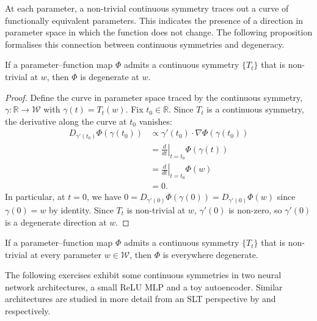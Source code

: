 \documentclass[11pt]{article}
\newcommand{\R}{\mathbb{R}}
\newcommand{\W}{\mathcal{W}}
\begin{document}
At each parameter, a non-trivial continuous symmetry traces out a curve of
functionally equivalent parameters. This indicates the presence of a direction
in parameter space in which the function does not change. The following
proposition formalises this connection between continuous symmetries and
degeneracy.

\begin{proposition}
\label{prop:symmetry-degeneracy}
    If a parameter--function map $\Phi$ admits a continuous symmetry $\{T_t\}$
    that is non-trivial at $w$, then $\Phi$ is degenerate at $w$.
\end{proposition}

\begin{proof}
    Define the curve in parameter space traced by the continuous symmetry,
    $\gamma : \R \to \W$ with $\gamma(t) = T_t(w)$.
    Fix $t_0 \in \R$. Since $T_t$ is a continuous symmetry, the derivative
    along the curve at $t_0$ vanishes:
    \begin{align*}
        D_{\gamma'(t_0)} \Phi(\gamma(t_0))
        &\propto \gamma'(t_0) \cdot \nabla \Phi(\gamma(t_0))
    \\  &= \left.\frac{d}{dt}\right|_{t=t_0} \Phi(\gamma(t))
            \tag{chain rule}
    \\  &= \left.\frac{d}{dt}\right|_{t=t_0} \Phi(w)
            \tag{symmetry, $\Phi \circ T_t = \Phi$}
    \\  &= 0.
            \tag{$\Phi(w)$ is constant in $t$}
    \end{align*}
    In particular, at $t=0$, we have
        $0 = D_{\gamma'(0)} \Phi(\gamma(0)) = D_{\gamma'(0)} \Phi(w)$
    since $\gamma(0) = w$ by identity. Since $T_t$ is non-trivial at $w$,
    $\gamma'(0)$ is non-zero, so $\gamma'(0)$ is a degenerate direction at $w$.
\end{proof}

\begin{corollary}
    If a parameter--function map $\Phi$ admits a continuous symmetry $\{T_t\}$
    that is non-trivial at every parameter $w \in \W$, then $\Phi$ is
    everywhere degenerate.
\end{corollary}

The following exercises exhibit some continuous symmetries in two neural
network architectures, a small ReLU MLP and a toy autoencoder. Similar
architectures are studied in more detail from an SLT perspective by
\citet{Carroll2021} and \citet{Chen+2023} respectively.
\end{document}
